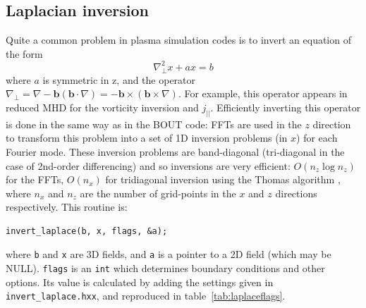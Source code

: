 \documentclass[12pt]{article}
\newcommand{\code}[1]{\texttt{#1}}
\begin{document}
\subsection{Laplacian inversion}
Quite a common problem in plasma simulation codes is to invert an equation of the form
\[
\nabla_\perp^2 x + a x = b
\]
where $a$ is symmetric in z, and the operator $\nabla_\perp = \nabla - \mathbf{b}\left(\mathbf{b}\cdot\nabla\right) = -\mathbf{b\times} \left(\mathbf{b\times}\nabla\right)$. For example, this operator
appears in reduced MHD for the vorticity inversion and $j_||$.
Efficiently inverting this operator is done in the same way as in the BOUT code:
FFTs are used in the $z$ direction to transform this problem into a set of 1D 
inversion problems (in $x$) for each Fourier mode.
These inversion problems are band-diagonal (tri-diagonal in the case of 2nd-order differencing) and so
inversions are very efficient: $O\left(n_z \log n_z\right)$ for the FFTs, $O\left(n_x\right)$ for tridiagonal inversion
using the Thomas algorithm \cite{press-1999}, where $n_x$ and $n_z$ are the number of grid-points
in the $x$ and $z$ directions respectively.
This routine is:
\begin{lstlisting}
invert_laplace(b, x, flags, &a);
\end{lstlisting}
where \code{b} and \code{x} are 3D fields, and \code{a} is a pointer to a 2D field (which may be
NULL). \code{flags} is an \code{int} which determines boundary conditions and other options.
Its value is calculated by adding the settings given in \code{invert\_laplace.hxx}, and reproduced in
table~\ref{tab:laplaceflags}.
\end{document}
